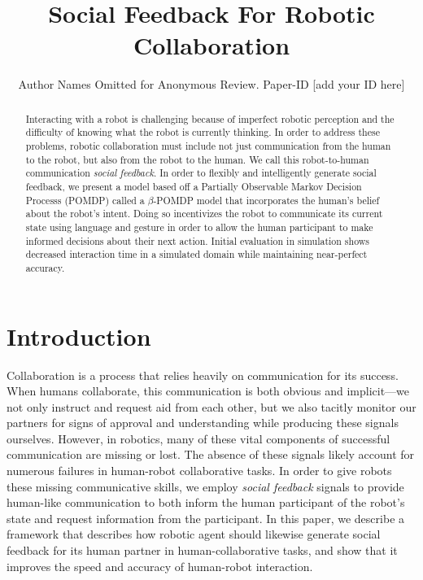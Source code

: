 \documentclass[conference]{IEEEtran}
\begin{document}
\title{Social Feedback For Robotic Collaboration}
\author{Author Names Omitted for Anonymous Review. Paper-ID [add your ID here]}


\maketitle


\begin{abstract}
	Interacting with a robot is challenging because of imperfect robotic perception and the difficulty of knowing what the robot is currently thinking. In order to address these problems, robotic collaboration must include not just communication from the human to the robot, but also from the robot to the human. We call this robot-to-human communication \emph{social feedback}. In order to flexibly and intelligently generate social feedback, we present a model based off a Partially Observable Markov Decision Processs (POMDP) called a $\beta$-POMDP model that incorporates the human's belief about the robot's intent. Doing so incentivizes the robot to communicate its current state using language and gesture in order to allow the human participant to make informed decisions about their next action. Initial evaluation in simulation shows decreased interaction time in a simulated domain while maintaining near-perfect accuracy. 
\end{abstract}

	
\section{Introduction}

Collaboration is a process that relies heavily on communication for its success. When humans collaborate, this communication is both obvious and implicit---we not only instruct and request aid from each other, but we also tacitly monitor our partners for signs of approval and understanding while producing these signals ourselves. However, in robotics, many of these vital components of successful communication are missing or lost. The absence of these signals likely account for numerous failures in human-robot collaborative tasks. In order to give robots these missing communicative skills, we employ \emph{social feedback} signals to provide human-like communication to both inform the human participant of the robot's state and request information from the participant. In this paper, we describe a  framework that describes how robotic agent should likewise generate social feedback for its human partner in human-collaborative tasks, and show that it improves the speed and accuracy of human-robot interaction. 
\end{document}
